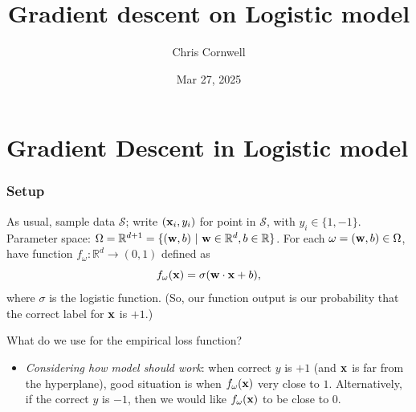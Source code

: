 \documentclass[smaller]{beamer}
\author{Chris Cornwell}
\date{Mar 27, 2025}
\title{Gradient descent on Logistic model}
\theoremstyle{example}
\begin{document}
\begin{frame}
\titlepage
\end{frame}

\section {Gradient Descent in Logistic model}

\begin{frame}
\frametitle{Setup}
    As usual, sample data $\mathcal S$; write $({\bf x}_i, y_i)$ for point in $\mathcal S$, with $y_i\in\{1, -1\}$. \newline 
    Parameter space: $\Omega = \mathbb R^{d+1} = \{({\bf w},b)\ |\ {\bf w}\in\mathbb R^d, b\in\mathbb R\}$. For each $\omega = ({\bf w},b) \in \Omega$, have function $f_{\omega}:\mathbb R^d\to(0,1)$ defined as 
            \[f_{\omega}({\bf x}) = \sigma({\bf w}\cdot{\bf x} + b),\]
    where $\sigma$ is the logistic function. (So, our function output is our probability that the correct label for ${\bf x}$ is $+1$.)
\pause

\vspace*{12pt}
What do we use for the empirical loss function? 
\begin{itemize}
    \item \textit{Considering how model should work}: when correct $y$ is $+1$ (and ${\bf x}$ is far from the hyperplane), good situation is when $f_{\omega}({\bf x})$ very close to $1$. Alternatively, if the correct $y$ is $-1$, then we would like $f_{\omega}({\bf x})$ to be close to $0$.
\end{itemize}
\end{frame}
\end{document}
